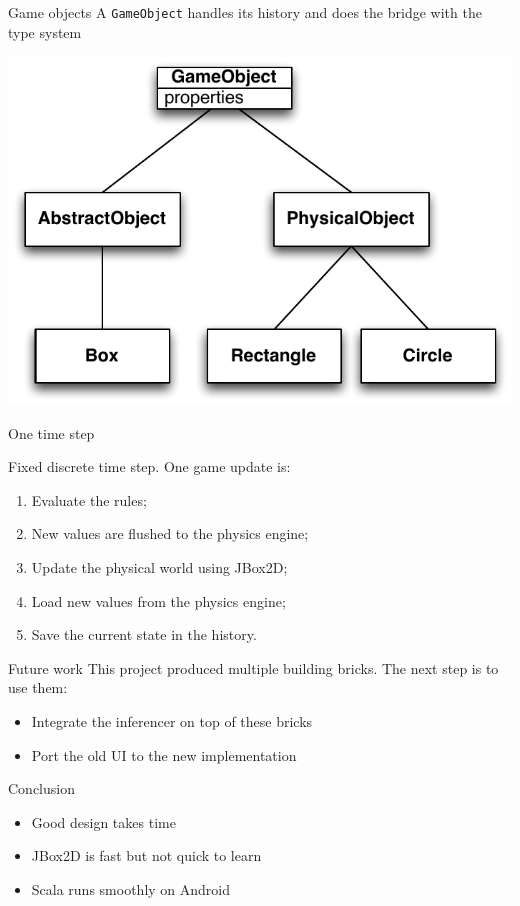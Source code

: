 \documentclass[12pt]{beamer}
\begin{document}
\begin{frame}{Game objects}
A \texttt{GameObject} handles its history and does the bridge with the type system
 
\begin{center}
\includegraphics[scale=0.65]{images/objects}
\end{center}

\end{frame}

\begin{frame}{One time step}

Fixed discrete time step. One game update is:
\vspace*{2mm}
\begin{enumerate}
\item Evaluate the rules;
\item New values are flushed to the physics engine;
\item Update the physical world using JBox2D;
\item Load new values from the physics engine;
\item Save the current state in the history.
\end{enumerate}

\end{frame}

\begin{frame}{Future work}
This project produced multiple building bricks. The next step is to use them:
\begin{itemize}
\item Integrate the inferencer on top of these bricks
\item Port the old UI to the new implementation
\end{itemize}
\end{frame}


\begin{frame}{Conclusion}
\begin{itemize}
\item Good design takes time
\item JBox2D is fast but not quick to learn
\item Scala runs smoothly on Android 
\end{itemize}
\end{frame}
\end{document}
